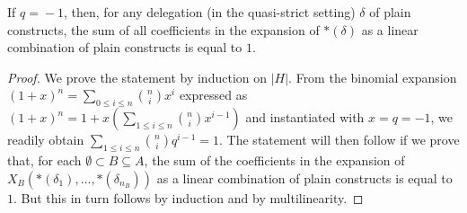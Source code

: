 \begin{lemma} \label{sum-coeff1} If $q\!\!=\!\!-1$, then, for any delegation (in the quasi-strict setting)  $\delta$ of plain constructs, the sum of all coefficients in the expansion of  $\ast(\delta)$ as a linear combination of plain constructs is equal to $1$.
\end{lemma}
\begin{proof} We prove the statement by induction on $|H|$.
From the binomial expansion
 $(1+x)^n=\sum_{0\leq i\leq n}\binom{n}{i} x^i$ expressed as   $(1+x)^n=1 + x(\sum_{1\leq i\leq n}\binom{n}{i} x^{i-1})$
and instantiated with $x=q= -1$, we readily obtain $\sum_{1\leq i\leq n}\binom{n}{i} q^{i-1}=1$.  The statement will then follow if we prove that, for each $\emptyset\subset B\subseteq A$, the sum of the coefficients in the expansion of  
$X_B(\ast(\delta_1),\ldots, \ast(\delta_{n_B}))$ as a linear combination of plain constructs is equal to $1$. But this in turn follows by induction and by multilinearity.
 \end{proof}

 

